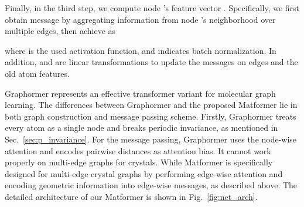 \documentclass{article}
\begin{document}
Finally, in the third step, we compute
node 's feature vector  .
Specifically, we first obtain message 
 by  
aggregating information from node 's neighborhood over multiple edges,
then achieve  as

where  is the used activation function, and  indicates batch normalization. In addition,  and  are linear transformations to update the messages on edges and the old atom features.

Graphormer represents an effective transformer variant for molecular graph learning. The differences between Graphormer and the proposed Matformer lie in both graph construction and message passing scheme. Firstly, Graphormer treats every atom as a single node and breaks periodic invariance, as mentioned in Sec.~\ref{sec:p_invariance}. For the message passing, Graphormer uses the node-wise attention and encodes pairwise distances as attention bias. It cannot work properly on multi-edge graphs for crystals. While Matformer is specifically designed for multi-edge crystal graphs by performing edge-wise attention and encoding geometric information into edge-wise messages, as described above. The detailed architecture of our Matformer is shown in Fig.~\ref{fig:net_arch}.
\end{document}
